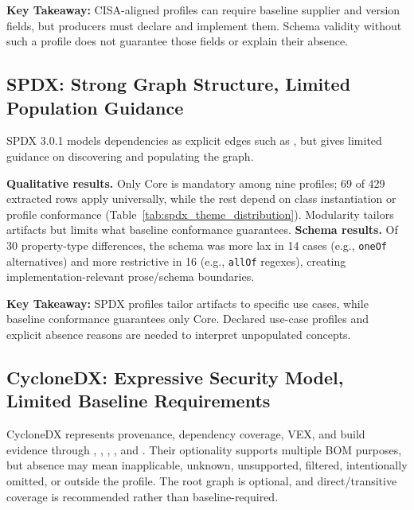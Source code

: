 \begin{tcolorbox}[colback=gray!4!white, colframe=black!80, boxrule=0.5pt, arc=5pt, left=2pt, right=2pt, top=1pt, bottom=1pt]
\textbf{Key Takeaway:} CISA-aligned profiles can require baseline supplier and version fields, but producers must declare and implement them. Schema validity without such a profile does not guarantee those fields or explain their absence.
\end{tcolorbox}

\subsection{SPDX: Strong Graph Structure, Limited Population Guidance}
SPDX 3.0.1 models dependencies as explicit  edges such as , but gives limited guidance on discovering and populating the graph.



\textbf{Qualitative results.} Only Core is mandatory among nine profiles; 69 of 429 extracted rows apply universally, while the rest depend on class instantiation or profile conformance (Table~\ref{tab:spdx_theme_distribution}). Modularity tailors artifacts but limits what baseline conformance guarantees. \textbf{Schema results.} Of 30 property-type differences, the schema was more lax in 14 cases (e.g., \texttt{oneOf} alternatives) and more restrictive in 16 (e.g., \texttt{allOf} regexes), creating implementation-relevant prose/schema boundaries.

\begin{tcolorbox}[colback=gray!4!white, colframe=black!80, boxrule=0.5pt, arc=5pt, left=2pt, right=2pt, top=1pt, bottom=1pt]
\textbf{Key Takeaway:} SPDX profiles tailor artifacts to specific use cases, while baseline conformance guarantees only Core. Declared use-case profiles and explicit absence reasons are needed to interpret unpopulated concepts.
\end{tcolorbox}

\subsection{CycloneDX: Expressive Security Model, Limited Baseline Requirements}
CycloneDX represents provenance, dependency coverage, VEX, and build evidence through , , , , and . Their optionality supports multiple BOM purposes, but absence may mean inapplicable, unknown, unsupported, filtered, intentionally omitted, or outside the profile. The root graph is optional, and direct/transitive coverage is recommended rather than baseline-required.

